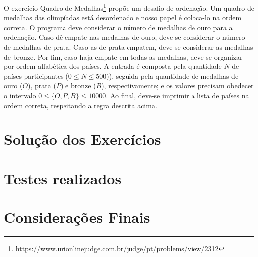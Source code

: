 \documentclass[12pt]{article}
\begin{document}
O exercício Quadro de Medalhas\footnote{\url{https://www.urionlinejudge.com.br/judge/pt/problems/view/2312}} propõe um desafio de ordenação. Um quadro de medalhas das olimpíadas está desordenado e nosso papel é coloca-lo na ordem correta. O programa deve considerar o número de medalhas de ouro para a ordenação. Caso dê empate nas medalhas de ouro, deve-se considerar o número de medalhas de prata. Caso as de prata empatem, deve-se considerar as medalhas de bronze. Por fim, caso haja empate em todas as medalhas, deve-se organizar por ordem alfabética dos países. A entrada é composta pela quantidade $N$ de países participantes ($0 \leq N \leq 500)$), seguida pela quantidade de medalhas de ouro ($O$), prata ($P$) e bronze ($B$), respectivamente; e os valores precisam obedecer o intervalo $0 \leq \{O, P, B\} \leq 10000$. Ao final, deve-se imprimir a lista de países na ordem correta, respeitando a regra descrita acima.

\section{Solução dos Exercícios} 
\label{sec:def}



\section{Testes realizados}
\label{sec:res}



\section{Considerações Finais}

%
%
\end{document}
